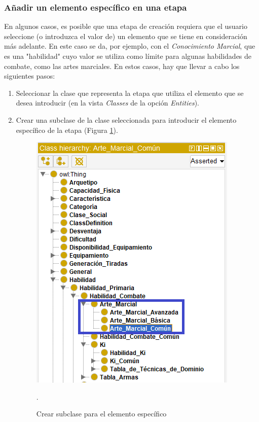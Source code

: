 \subsubsection{Añadir un elemento específico en una etapa}
En algunos casos, es posible que una etapa de creación requiera que el usuario seleccione (o introduzca el valor de) un elemento 
que se tiene en consideración más adelante. En \anima este caso se da, por ejemplo, con el \textit{Conocimiento Marcial}, que es 
una "habilidad" cuyo valor se utiliza como límite para algunas habilidades de combate, como las artes marciales. 
En estos casos, hay que llevar a cabo los siguientes pasos:

\begin{enumerate}
    \item Seleccionar la clase que representa la etapa que utiliza el elemento que se desea introducir 
    (en la vista \textit{Classes} de la opción \textit{Entities}).
    \item Crear una subclase de la clase seleccionada para introducir el elemento específico de la etapa 
    (Figura \ref*{ElementoComun_1}).
    \begin{figure}[H]
        \centering
        \includegraphics[scale=0.6]{Figures/Protege/ElementoComun_1.png}
        \caption{Crear subclase para el elemento específico}.
        \label{ElementoComun_1}
    \end{figure}


\end{enumerate}
